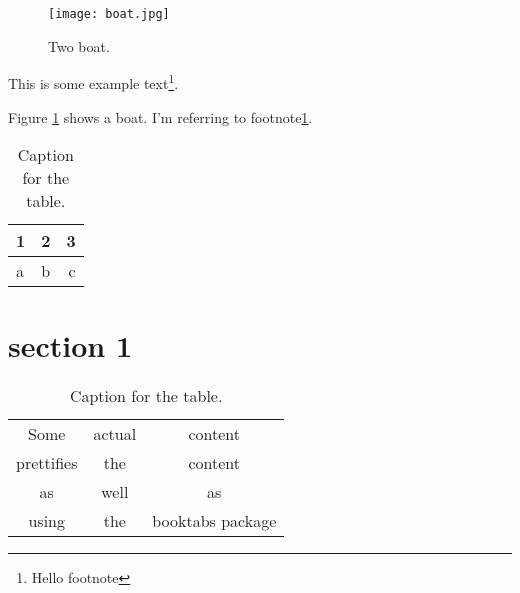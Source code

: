 \documentclass{article}
\begin{document}
\begin{figure}
  \texttt{[image: boat.jpg]}
  \caption{Two boat.}
  \label{fig:boat1}
\end{figure}
This is some example text\footnote{\label{myfootnote}Hello footnote}.

Figure \ref{fig:boat1} shows a boat.
I'm referring to footnote\ref{myfootnote}.


\begin{table}[h!]
  \centering
  \caption{Caption for the table.}
  \label{tab:table1}
  \begin{tabular}{l|c||r}
    1 & 2 & 3\\
    \hline
    a & b & c\\
  \end{tabular}
\end{table}

\section{section 1}


\begin{table}[h!]
\centering
\caption{Caption for the table.}
  \label{tab:table1}
  \begin{tabular}{ccc}
    Some & actual & content\\
    prettifies & the & content\\
    as & well & as\\
    using & the & booktabs package\\
  \end{tabular}
\end{table}
\end{document}
